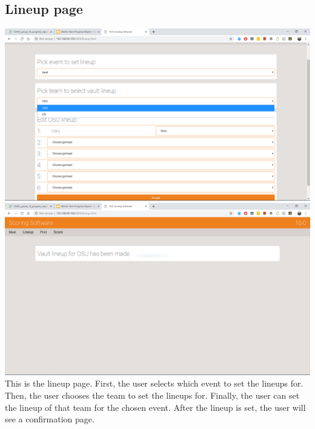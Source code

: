 \documentclass[letterpaper,10pt,draftclsnofoot,onecolumn,]{article}
\begin{document}
\subsection{Lineup page}
\includegraphics[width=\textwidth]{Capture3.PNG}
\includegraphics[width=\textwidth]{Capture4.PNG}
This is the lineup page. First, the user selects which event to set the lineups for. Then, the user chooses the team to set the lineups for. Finally, the user can set the lineup of that team for the chosen event. After the lineup is set, the user will see a confirmation page.
\end{document}
